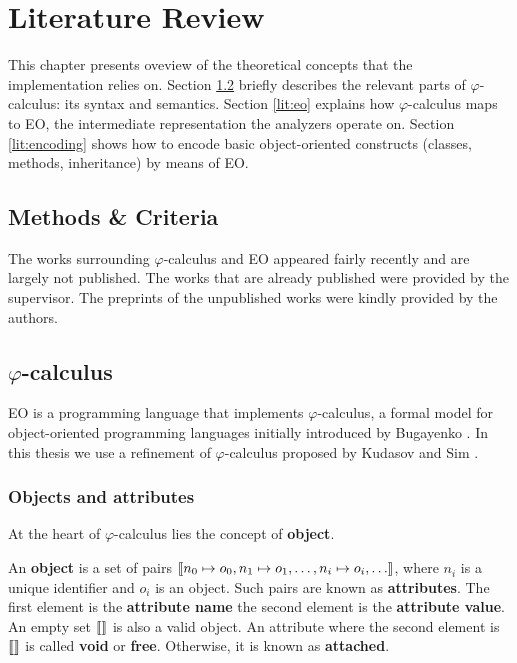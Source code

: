 \chapter{Literature Review}
\label{chap:lr}
This chapter presents oveview of the theoretical concepts that the implementation relies on. Section \ref{lit:phicalc} briefly describes the relevant parts of $\varphi$-calculus: its syntax and semantics. Section \ref{lit:eo} explains how $\varphi$-calculus maps to EO, the intermediate representation the analyzers operate on. Section \ref{lit:encoding} shows how to encode basic object-oriented constructs (classes, methods, inheritance) by means of EO. 

\section{Methods \& Criteria}
The works surrounding $\varphi$-calculus and EO appeared fairly recently and are largely not published. The works that are already published were provided by the supervisor. The preprints of the unpublished works were kindly provided by the authors. 

\section{$\varphi$-calculus}
\label{lit:phicalc}

EO is a programming language that implements $\varphi$-calculus, a formal model for object-oriented programming languages initially introduced by Bugayenko \cite{eolang}. In this thesis we use a refinement of $\varphi$-calculus proposed by Kudasov and Sim \cite{kudasov}.

\subsection{Objects and attributes}
At the heart of $\varphi$-calculus lies the concept of \textbf{object}.

\begin{definition}
    An \textbf{object} is a set of pairs $\llbracket n_0 \mapsto o_0, n_1 \mapsto o_1, \hdots, n_i \mapsto o_i, \hdots \rrbracket$, where $n_i$ is a unique identifier and $o_i$ is an object. Such pairs are known as \textbf{attributes}. The first element is the \textbf{attribute name} the second element is the \textbf{attribute value}. An empty set $\llbracket  \rrbracket$ is also a valid object. An attribute where the second element is $\llbracket  \rrbracket$ is called \textbf{void} or \textbf{free}. Otherwise, it is known as \textbf{attached}.
\end{definition}

